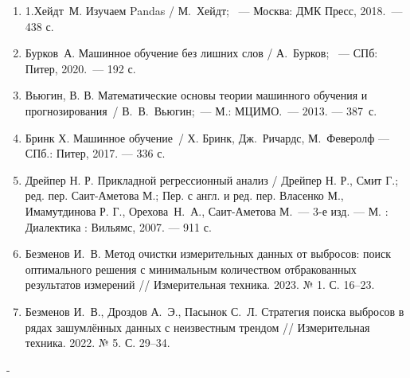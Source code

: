\documentclass[a4paper,12pt]{article}
\begin{document}
\begin{enumerate}
	\item 1.Хейдт М. Изучаем Pandas / М. Хейдт;  — Москва: ДМК Пресс, 2018. — 438 с.
	\item Бурков А. Машинное обучение без лишних слов / А. Бурков;  — СПб: Питер, 2020. — 192 с. 
	\item Вьюгин, В. В. Математические основы теории машинного обучения и прогнозирования / В. В. Вьюгин; — М.: МЦИМО. — 2013. — 387~с. 
	\item Бринк Х. Машинное обучение / Х. Бринк, Дж. Ричардс, М. Феверолф  — СПб.: Питер, 2017. — 336 с.
	\item Дрейпер Н. Р. Прикладной регрессионный анализ / Дрейпер Н. Р., Смит Г.; ред. пер. Саит-Аметова М.; Пер. с англ. и ред. пер. Власенко М., Имамутдинова Р. Г., Орехова Н. А., Саит-Аметова М.~--- 3-е изд. --- М. : Диалектика : Вильямс, 2007. --- 911 с.
	\item Безменов И. В. Метод очистки измерительных данных от выбросов: поиск оптимального решения с минимальным количеством отбракованных результатов измерений // Измерительная техника. 2023. № 1. С. 16--23. 
	\item Безменов И. В., Дроздов А. Э., Пасынок С. Л. Стратегия поиска выбросов в рядах зашумлённых данных с неизвестным трендом // Измерительная техника. 2022. № 5. С. 29--34.
\end{enumerate}

-
\end{document}
